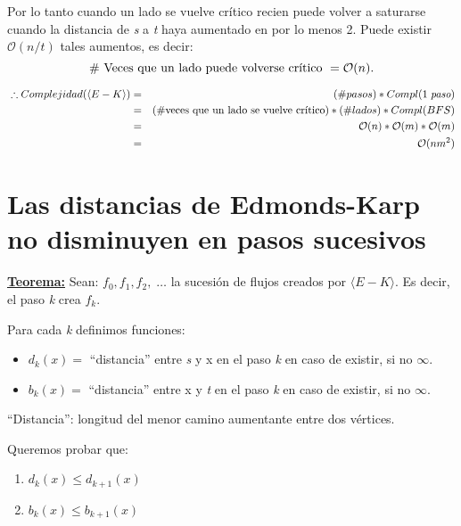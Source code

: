 \documentclass[12pt,a4paper]{report}
\begin{document}
			\vspace{5mm}
			\par Por lo tanto cuando un lado se vuelve crítico recien puede volver a saturarse cuando la distancia de \textit{s} a \textit{t} haya aumentado en por lo menos 2. Puede existir $\mathcal{O}(n/t)$ tales aumentos, es decir:
				\[ \# \textup{ Veces que un lado puede volverse crítico } = \mathcal{O}(n). \]

			\begin{eqnarray}
				\nonumber \; \therefore Complejidad(\langle E-K\rangle) &=& (\# pasos) * Compl(1 \; \textit{paso}) \\
				\nonumber &=& (\# \textup{veces que un lado se vuelve crítico}) * (\# lados) * Compl(BFS) \\
				\nonumber  &=& \mathcal{O}(n) * \mathcal{O}(m)* \mathcal{O}(m) \\
				\nonumber &=& \mathcal{O}(nm^{2})
			\end{eqnarray}


	\section{Las distancias de Edmonds-Karp no disminuyen en pasos sucesivos}
		\textbf{\underline{Teorema:}} Sean: $f_{0}, f_{1}, f_{2}, \; \dotsc$ \; la sucesión de flujos creados por $\langle E-K\rangle$. Es decir, el paso \textit{k} crea $f_{k}$.

			\vspace{5mm}
			\par Para cada \textit{k} definimos funciones:

			\begin{itemize}
				\item $d_{k}(x) =$ \textquotedblleft distancia\textquotedblright \; entre \textit{s} y x en el paso \textit{k} en caso de existir, si no $\infty$.
				\item $b_{k}(x) =$ \textquotedblleft distancia\textquotedblright \; entre x y \textit{t} en el paso \textit{k} en caso de existir, si no $\infty$.
			\end{itemize}

			\textquotedblleft Distancia\textquotedblright: longitud del menor camino aumentante entre dos vértices.

			\vspace{5mm}
			\par Queremos probar que:
			\begin{enumerate}
				\item $d_{k}(x) \leq d_{k + 1}(x)$
				\item $b_{k}(x) \leq b_{k + 1}(x)$
			\end{enumerate}
\end{document}
